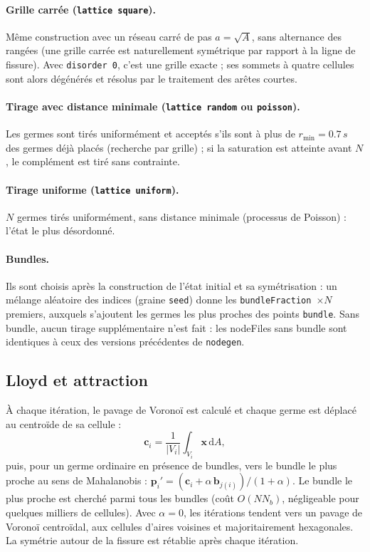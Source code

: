 \documentclass[11pt,a4paper]{article}
\newcommand{\code}[1]{\texttt{#1}}
\newcommand{\toolgen}{\code{nodegen}}
\begin{document}
\paragraph{Grille carrée (\code{lattice square}).} Même construction avec un réseau carré de pas $a=\sqrt{A}$,
sans alternance des rangées (une grille carrée est naturellement symétrique par rapport à la ligne de fissure).
Avec \code{disorder 0}, c'est une grille exacte ; ses sommets à quatre cellules sont alors dégénérés et
résolus par le traitement des arêtes courtes.

\paragraph{Tirage avec distance minimale (\code{lattice random} ou \code{poisson}).} Les germes sont tirés
uniformément et acceptés s'ils sont à plus de $r_{\min}=0.7\,s$ des germes déjà placés (recherche par grille) ; si
la saturation est atteinte avant $N$, le complément est tiré sans contrainte.

\paragraph{Tirage uniforme (\code{lattice uniform}).} $N$ germes tirés uniformément, sans distance minimale
(processus de Poisson) : l'état le plus désordonné.

\paragraph{Bundles.} Ils sont choisis après la construction de l'état initial et sa symétrisation : un mélange
aléatoire des indices (graine \code{seed}) donne les \code{bundleFraction}~$\times N$ premiers, auxquels s'ajoutent
les germes les plus proches des points \code{bundle}. Sans bundle, aucun tirage supplémentaire n'est fait : les
nodeFiles sans bundle sont identiques à ceux des versions précédentes de \toolgen.

\subsection{Lloyd et attraction}

À chaque itération, le pavage de Voronoï est calculé et chaque germe est déplacé au centroïde de sa cellule :
\[
  \mathbf c_i = \frac{1}{|V_i|}\int_{V_i}\mathbf x\,\mathrm dA ,
\]
puis, pour un germe ordinaire en présence de bundles, vers le bundle le plus proche au sens de Mahalanobis :
$\mathbf p_i' = (\mathbf c_i+\alpha\,\mathbf b_{j(i)})/(1+\alpha)$. Le bundle le plus proche est cherché parmi tous
les bundles (coût $O(N N_b)$, négligeable pour quelques milliers de cellules). Avec $\alpha=0$, les itérations
tendent vers un pavage de Voronoï centroïdal, aux cellules d'aires voisines et majoritairement hexagonales. La
symétrie autour de la fissure est rétablie après chaque itération.
\end{document}
